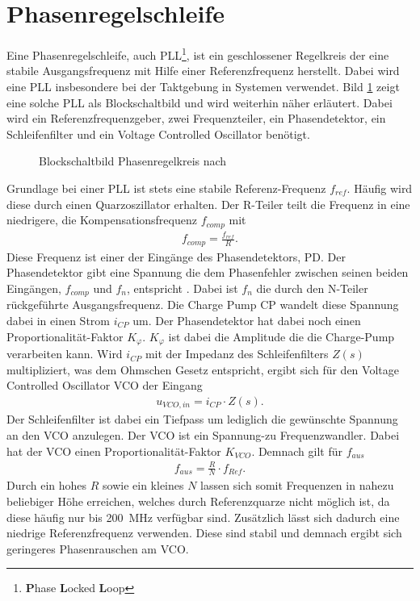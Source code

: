 \section{Phasenregelschleife}
Eine Phasenregelschleife, auch PLL\footnote{ \textbf{P}hase \textbf{L}ocked \textbf{L}oop}, ist ein geschlossener Regelkreis der eine stabile Ausgangsfrequenz mit Hilfe einer Referenzfrequenz herstellt. Dabei wird eine PLL insbesondere bei der Taktgebung in Systemen verwendet. Bild \ref{fig:PLL_Blockerino} zeigt eine solche PLL als Blockschaltbild und wird weiterhin näher erläutert. Dabei wird ein Referenzfrequenzgeber, zwei Frequenzteiler, ein Phasendetektor, ein Schleifenfilter und ein Voltage Controlled Oscillator benötigt.
\begin{figure}[tbp]
  \centering
  
  \caption{Blockschaltbild Phasenregelkreis nach \cite{PLL_Perf}}
  \label{fig:PLL_Blockerino}
\end{figure}
Grundlage bei einer PLL ist stets eine stabile Referenz-Frequenz $f_{ref}$. Häufig wird diese durch einen Quarzoszillator erhalten. Der R-Teiler teilt die Frequenz in eine niedrigere, die Kompensationsfrequenz $f_{comp}$ mit 
\begin{align}
f_{comp} = \frac{f_{ref}}{R}.
\end{align} 
Diese Frequenz ist einer der Eingänge des Phasendetektors, PD. Der Phasendetektor gibt eine Spannung die dem Phasenfehler zwischen seinen beiden Eingängen, $f_{comp}$ und $f_{n}$, entspricht .  Dabei ist $f_{n}$ die durch den N-Teiler rückgeführte Ausgangsfrequenz. Die Charge Pump CP wandelt diese Spannung dabei in einen Strom $i_{CP}$ um. Der Phasendetektor hat dabei noch einen Proportionalität-Faktor $K_{\varphi}$. $K_{\varphi}$ ist dabei die Amplitude die die Charge-Pump verarbeiten kann. Wird $i_{CP}$ mit der Impedanz des Schleifenfilters $Z(s)$ multipliziert, was dem Ohmschen Gesetz entspricht, ergibt sich für den Voltage Controlled Oscillator VCO der Eingang 
\begin{align}
u_{VCO,in} = i_{CP}\cdot Z(s).
\end{align} 
Der Schleifenfilter ist dabei ein Tiefpass um lediglich die gewünschte Spannung an den VCO anzulegen. Der VCO ist ein Spannung-zu Frequenzwandler. Dabei hat der VCO einen Proportionalität-Faktor $K_{VCO}$. Demnach gilt für $f_{aus}$
\begin{align}
f_{aus} = \frac{R}{N} \cdot f_{Ref}.
\end{align} 
Durch ein hohes $R$ sowie ein kleines $N$ lassen sich somit Frequenzen in nahezu beliebiger Höhe erreichen, welches durch Referenzquarze nicht möglich ist, da diese häufig nur bis \SI{200}{\mega\hertz} verfügbar sind. Zusätzlich lässt sich dadurch eine niedrige Referenzfrequenz verwenden. Diese sind stabil und demnach ergibt sich geringeres Phasenrauschen am VCO.\\
